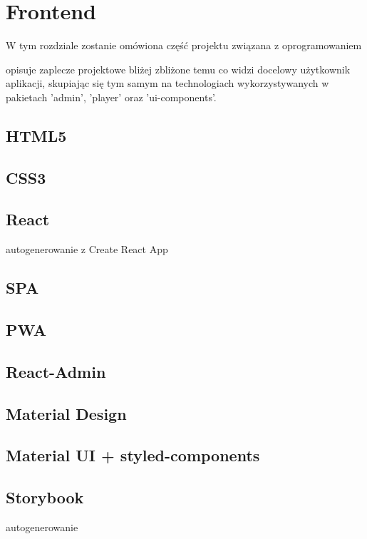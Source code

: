 \chapter{Frontend}
\label{ch:funplenop}
W tym rozdziale zostanie omówiona część projektu związana z oprogramowaniem

opisuje zaplecze projektowe bliżej zbliżone temu co widzi docelowy użytkownik aplikacji, skupiając się tym samym na technologiach wykorzystywanych w pakietach 'admin', 'player' oraz 'ui-components'.

\section{HTML5}
\section{CSS3}
\section{React}
autogenerowanie z Create React App
\section{SPA}
\section{PWA}
\section{React-Admin}
\section{Material Design}
\section{Material UI + styled-components}
\section{Storybook}
autogenerowanie
